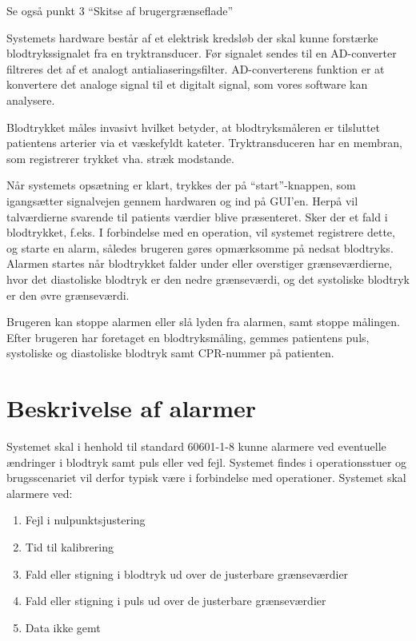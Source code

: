 \vspace{0.7 cm}
Se også punkt 3 “Skitse af brugergrænseflade”


Systemets hardware består af et elektrisk kredsløb der skal kunne forstærke blodtrykssignalet fra en tryktransducer. Før signalet sendes til en AD-converter filtreres det af et analogt antialiaseringsfilter. AD-converterens funktion er at konvertere det analoge signal til et digitalt signal, som vores software kan analysere.

Blodtrykket måles invasivt hvilket betyder, at blodtryksmåleren er tilsluttet patientens arterier via et væskefyldt kateter. Tryktransduceren har en membran, som registrerer trykket vha. stræk modstande.


Når systemets opsætning er klart, trykkes der på “start”-knappen, som igangsætter signalvejen gennem hardwaren og ind på GUI'en. Herpå vil talværdierne svarende til patients værdier blive præsenteret. Sker der et fald i blodtrykket, f.eks. I forbindelse med en operation, vil systemet registrere dette, og starte en alarm, således brugeren gøres opmærksomme på nedsat blodtryks. Alarmen startes når blodtrykket falder under eller overstiger grænseværdierne, hvor det diastoliske blodtryk er den nedre grænseværdi, og det systoliske blodtryk er den øvre grænseværdi.  


Brugeren kan stoppe alarmen eller slå lyden fra alarmen, samt stoppe målingen. Efter brugeren har foretaget en blodtryksmåling, gemmes patientens puls, systoliske og diastoliske blodtryk samt CPR-nummer på patienten.
\vspace{0.9 cm}
\section{Beskrivelse af alarmer}

Systemet skal i henhold til standard 60601-1-8 kunne alarmere ved eventuelle ændringer i blodtryk samt puls eller ved fejl. Systemet findes i operationsstuer og brugsscenariet vil derfor typisk være i forbindelse med operationer. Systemet skal alarmere ved:

\begin{enumerate}[2.2.1]
	\item Fejl i nulpunktsjustering
	\item Tid til kalibrering
	\item Fald eller stigning i blodtryk ud over de justerbare grænseværdier
	\item Fald eller stigning i puls ud over de justerbare grænseværdier
	\item Data ikke gemt
\end{enumerate}

